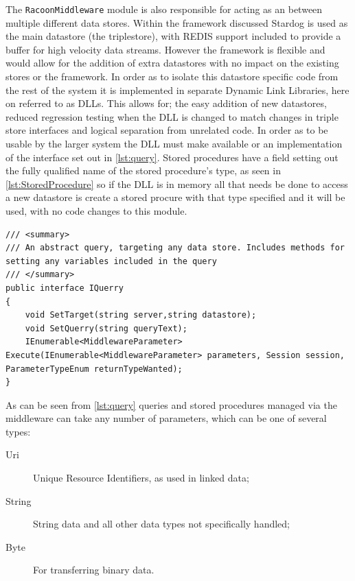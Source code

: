 The \texttt{RacoonMiddleware} module is also responsible for acting as an  between multiple different data stores. Within the framework discussed Stardog is used as the main datastore (the triplestore), with REDIS support included to provide a buffer for high velocity data streams. However the framework is flexible and would allow for the addition of extra datastores with no impact on the existing stores or the framework. In order as to isolate this datastore specific code from the rest of the system it is implemented in separate Dynamic Link Libraries, here on referred to as DLLs. This allows for; the easy addition of new datastores, reduced regression testing when the DLL is changed to match changes in triple store interfaces and logical separation from unrelated code. In order as to be usable by the larger system the DLL must make available or  an implementation of the interface set out in \autoref{lst:query}. Stored procedures have a field setting out the fully qualified name of the stored procedure's type, as seen in \autoref{lst:StoredProcedure} so if the DLL is in memory all that needs be done to access a new datastore is create a stored procure with that type specified and it will be used, with no code changes to this module. 

\begin{lstlisting}[language={[Sharp]C},frame=tb,caption={The IQuery interface, which must be implemented by all executable queries},label=lst:query]
/// <summary>
/// An abstract query, targeting any data store. Includes methods for setting any variables included in the query
/// </summary>
public interface IQuerry
{
    void SetTarget(string server,string datastore);
    void SetQuerry(string queryText);
    IEnumerable<MiddlewareParameter> Execute(IEnumerable<MiddlewareParameter> parameters, Session session, ParameterTypeEnum returnTypeWanted);      
}
\end{lstlisting}

As can be seen from \autoref{lst:query} queries and stored procedures managed via the middleware can take any number of parameters, which can be one of several types:

\begin{description}
    \item[Uri]  Unique Resource Identifiers, as used in linked data;
    \item[String] String data and all other data types not specifically handled;    
    \item[Byte] For transferring binary data.
\end{description}

